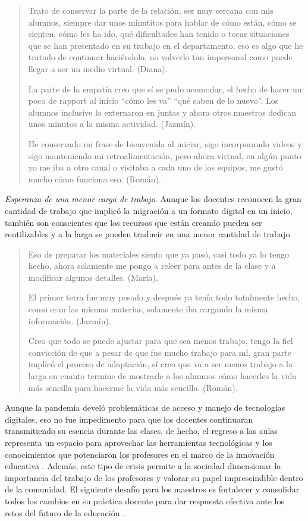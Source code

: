 \documentclass[spanish]{textolivre}
\begin{document}
\begin{quote}
    Trato de conservar la parte de la relación, ser muy cercana con mis alumnos, siempre dar unos minutitos para hablar de cómo están, cómo se sienten, cómo les ha ido, qué dificultades han tenido o tocar situaciones que se han presentado en su trabajo en el departamento, eso es algo que he tratado de continuar haciéndolo, no volverlo tan impersonal como puede llegar a ser un medio virtual. (Diana).
    
    La parte de la empatía creo que sí se pudo acomodar, el hecho de hacer un poco de rapport al inicio “cómo les va” “qué saben de lo nuevo”. Los alumnos inclusive lo externaron en juntas y ahora otros maestros dedican unos minutos a la misma actividad. (Jazmín).
    
    He conservado mi frase de bienvenida al iniciar, sigo incorporando videos y sigo manteniendo mi retroalimentación, pero ahora virtual, en algún punto yo me iba a otro canal o visitaba a cada uno de los equipos, me gustó mucho cómo funciona eso. (Román).
\end{quote}

\textit{Esperanza de una menor carga de trabajo}. Aunque los docentes reconocen la gran cantidad de trabajo que implicó la migración a un formato digital en un inicio, también son conscientes que los recursos que están creando pueden ser reutilizables y a la larga se pueden traducir en una menor cantidad de trabajo. 

\begin{quote}
    Eso de preparar los materiales siento que ya pasó, casi todo ya lo tengo hecho, ahora solamente me pongo a releer para antes de la clase y a modificar algunos detalles. (María).
    
    El primer tetra fue muy pesado y después ya tenía todo totalmente hecho, como eran las mismas materias, solamente iba cargando la misma información. (Jazmín).
    
    Creo que todo se puede ajustar para que sea menos trabajo, tengo la fiel convicción de que a pesar de que fue mucho trabajo para mí, gran parte implicó el proceso de adaptación, sí creo que va a ser menos trabajo a la larga en cuanto termine de mostrarle a los alumnos cómo hacerles la vida más sencilla para hacerme la vida más sencilla. (Román).
\end{quote}

Aunque la pandemia develó problemáticas de acceso y manejo de tecnologías digitales, eso no fue impedimento para que los docentes continuaran transmitiendo su esencia durante las clases, de hecho, el regreso a las aulas representa un espacio para aprovechar las herramientas tecnológicas y los conocimientos que potenciaron los profesores en el marco de la innovación educativa \cite{valle_martinez_experiencia_2020}. Además, este tipo de crisis permite a la sociedad dimensionar la importancia del trabajo de los profesores y valorar su papel imprescindible dentro de la comunidad. El siguiente desafío para los maestros es fortalecer y consolidar todos los cambios en su práctica docente para dar respuesta efectiva ante los retos del futuro de la educación \cite{donitsa-schmidt_opportunities_2020}.
\end{document}
